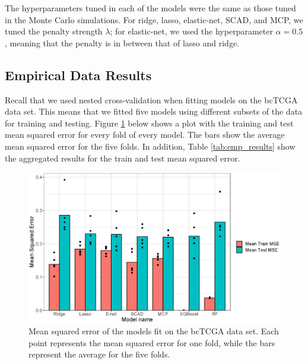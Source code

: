 \documentclass{article}
\begin{document}
The hyperparameters tuned in each of the models were the same as those tuned in the Monte Carlo simulations. For ridge, lasso, elastic-net, SCAD, and MCP, we tuned the penalty strength $\lambda$; for elastic-net, we used the hyperparameter $\alpha = 0.5$, meaning that the penalty is in between that of lasso and ridge. 

\subsection{Empirical Data Results}
Recall that we used nested cross-validation when fitting models on the bcTCGA data set. This means that we fitted five models using different subsets of the data for training and testing. Figure \ref{fig:empirical_mse} below shows a plot with the training and test mean squared error for every fold of every model. The bars show the average mean squared error for the five folds. In addition, Table \ref{tab:emp_results} show the aggregated results for the train and test mean squared error.

\begin{figure}[h!]
	\centering
	\includegraphics[width = 0.8\linewidth]{images/empirical_mse.eps}
	\captionsetup{width = 0.8\textwidth}
	\caption{Mean squared error of the models fit on the bcTCGA data set. Each point represents the mean squared error for one fold, while the bars represent the average for the five folds.}
	\label{fig:empirical_mse}
\end{figure}
\end{document}
